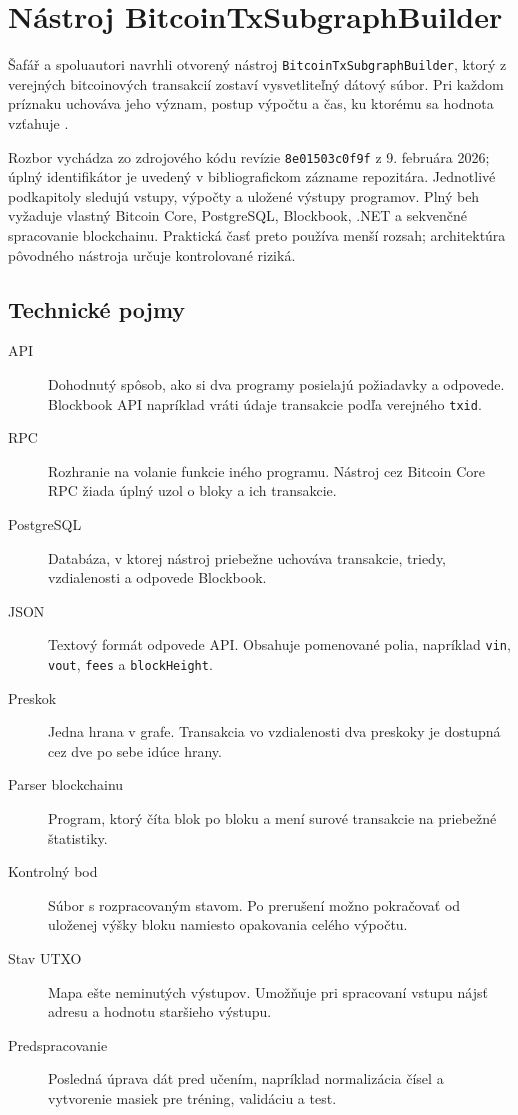 \section{Nástroj BitcoinTxSubgraphBuilder}
\label{sec:safar-tool}

Šafář a spoluautori navrhli otvorený nástroj
\texttt{BitcoinTxSubgraphBuilder}, ktorý z verejných bitcoinových
transakcií zostaví vysvetliteľný dátový súbor. Pri každom príznaku
uchováva jeho význam, postup výpočtu a čas, ku ktorému sa hodnota
vzťahuje \cite{safar2026elliptic,bitcoinSubgraphBuilder}.

Rozbor vychádza zo zdrojového kódu revízie
\texttt{8e01503c0f9f} z 9. februára 2026; úplný identifikátor je uvedený
v bibliografickom zázname repozitára. Jednotlivé podkapitoly sledujú
vstupy, výpočty a uložené výstupy programov. Plný beh vyžaduje vlastný
Bitcoin Core, PostgreSQL, Blockbook, .NET a sekvenčné spracovanie
blockchainu. Praktická časť preto používa menší rozsah; architektúra
pôvodného nástroja určuje kontrolované riziká.

\subsection{Technické pojmy}

\begin{description}
  \item[API] Dohodnutý spôsob, ako si dva programy posielajú požiadavky
  a odpovede. Blockbook API napríklad vráti údaje transakcie podľa
  verejného \texttt{txid}.
  \item[RPC] Rozhranie na volanie funkcie iného programu. Nástroj cez
  Bitcoin Core RPC žiada úplný uzol o bloky a ich transakcie.
  \item[PostgreSQL] Databáza, v ktorej nástroj priebežne uchováva
  transakcie, triedy, vzdialenosti a odpovede Blockbook.
  \item[JSON] Textový formát odpovede API. Obsahuje pomenované polia,
  napríklad \texttt{vin}, \texttt{vout}, \texttt{fees} a
  \texttt{blockHeight}.
  \item[Preskok] Jedna hrana v grafe. Transakcia vo vzdialenosti dva
  preskoky je dostupná cez dve po sebe idúce hrany.
  \item[Parser blockchainu] Program, ktorý číta blok po bloku a mení
  surové transakcie na priebežné štatistiky.
  \item[Kontrolný bod] Súbor s rozpracovaným stavom. Po prerušení možno
  pokračovať od uloženej výšky bloku namiesto opakovania celého výpočtu.
  \item[Stav UTXO] Mapa ešte neminutých výstupov. Umožňuje pri spracovaní
  vstupu nájsť adresu a hodnotu staršieho výstupu.
  \item[Predspracovanie] Posledná úprava dát pred učením, napríklad
  normalizácia čísel a vytvorenie masiek pre tréning, validáciu a test.
\end{description}

